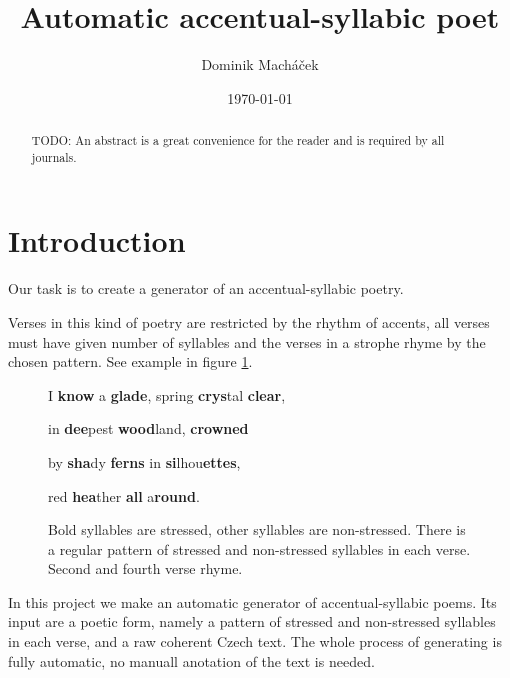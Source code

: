 \documentclass[a4]{article}
\begin{document}
\title{Automatic accentual-syllabic poet}

\author{Dominik Macháček}

\date{\today}

\maketitle

\begin{abstract}
TODO: An abstract is a great convenience for the reader and is required by all journals.
\end{abstract}


\section{Introduction}

Our task is to create a generator of an accentual-syllabic poetry.

Verses in this kind of poetry are restricted by the rhythm of accents, all
verses must have given number of syllables and the verses in a strophe
rhyme by the chosen pattern. See example in figure \ref{may}.

\begin{figure}[ht]
\label{may}
\centerline{
I {\bf know} a {\bf glade}, spring {\bf crys}tal {\bf clear},
}
\centerline{
in {\bf dee}pest {\bf wood}land, {\bf crowned}
}
\centerline{
by {\bf sha}dy {\bf ferns} in {\bf si}lhou{\bf ettes},
}
\centerline{
red {\bf hea}ther {\bf all} a{\bf round}.\footnotemark
}
\caption{Bold syllables are stressed, other syllables are non-stressed.
There is a regular pattern of stressed and non-stressed
syllables in each verse. Second and fourth verse rhyme.
}
\end{figure}






In this project we make an automatic generator of accentual-syllabic
poems. Its input are a poetic form, namely a pattern of stressed and
non-stressed syllables in each verse, and a raw coherent Czech text. The
whole process of generating is fully automatic, no manuall anotation of
the text is needed.
\end{document}
